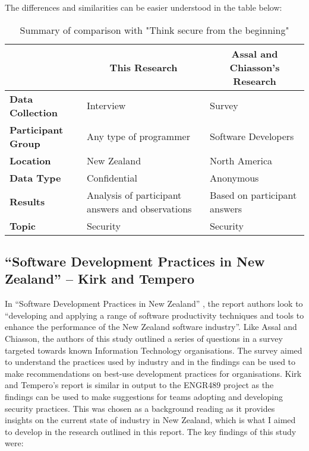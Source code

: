 The differences and similarities can be easier understood in the table below:
\newline
\begin{table}[htb]
\begin{tabular}{|l|l|l|}
\hline
\multicolumn{1}{|c|}{} &
\multicolumn{1}{|c|}{\textbf{This Research}}              & \multicolumn{1}{c|}{\textbf{Assal and Chiasson's Research}} \\ \hline
\textbf{Data Collection} & Interview                 & Survey                 \\ \hline
\textbf{Participant Group}                  & Any type of programmer  & Software Developers                                        \\ \hline
\textbf{Location}             & New Zealand        & North America   \\ \hline
\textbf{Data Type}     & Confidential & Anonymous \\ \hline
\textbf{Results}              & Analysis of participant answers and observations & Based on participant answers                  \\ \hline
\textbf{Topic}                & Security                  & Security \\ \hline
\end{tabular}
\centering
\newline
\caption{Summary of comparison with "Think secure from the beginning"}
\centering
\end{table}


\newpage
\subsection{“Software Development Practices in New Zealand” – Kirk and Tempero}

\par In “Software Development Practices in New Zealand” \cite{summary2}, the report authors look to “developing and applying a range of software productivity techniques and tools to enhance the performance of the New Zealand software industry”. Like Assal and Chiasson, the authors of this study outlined a series of questions in a survey targeted towards known Information Technology organisations. The survey aimed to understand the practices used by industry and in the findings can be used to make recommendations on best-use development practices for organisations. Kirk and Tempero’s report is similar in output to the ENGR489 project as the findings can be used to make suggestions for teams adopting and developing security practices. This was chosen as a background reading as it provides insights on the current state of industry in New Zealand, which is what I aimed to develop in the research outlined in this report. 
\newline
\newline
The key findings of this study were:

